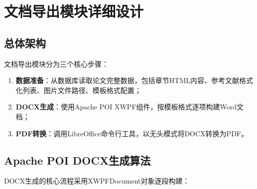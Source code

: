 \section{文档导出模块详细设计}

\subsection{总体架构}

文档导出模块分为三个核心步骤：
\begin{enumerate}
    \item \textbf{数据准备}：从数据库读取论文完整数据，包括章节HTML内容、参考文献格式化列表、图片文件路径、模板格式配置；
    \item \textbf{DOCX生成}：使用Apache POI XWPF组件，按模板格式逐项构建Word文档；
    \item \textbf{PDF转换}：调用LibreOffice命令行工具，以无头模式将DOCX转换为PDF。
\end{enumerate}

\subsection{Apache POI DOCX生成算法}

DOCX生成的核心流程采用XWPFDocument对象逐段构建：

